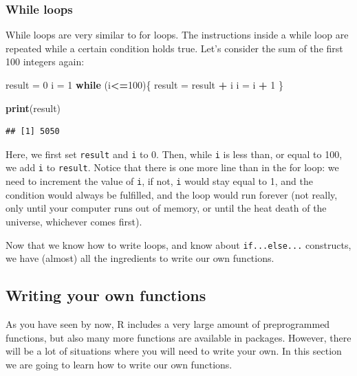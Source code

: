 \documentclass[]{gitbook}
\newenvironment{Shaded}{\begin{snugshade}}{\end{snugshade}}
\newcommand{\ControlFlowTok}[1]{\textcolor[rgb]{0.13,0.29,0.53}{\textbf{#1}}}
\newcommand{\DecValTok}[1]{\textcolor[rgb]{0.00,0.00,0.81}{#1}}
\newcommand{\KeywordTok}[1]{\textcolor[rgb]{0.13,0.29,0.53}{\textbf{#1}}}
\newcommand{\NormalTok}[1]{#1}
\newcommand{\OperatorTok}[1]{\textcolor[rgb]{0.81,0.36,0.00}{\textbf{#1}}}
\newcommand{\StringTok}[1]{\textcolor[rgb]{0.31,0.60,0.02}{#1}}
\begin{document}
\hypertarget{while-loops}{%
\subsubsection{While loops}\label{while-loops}}

While loops are very similar to for loops. The instructions inside a while loop are repeated while a
certain condition holds true. Let's consider the sum of the first 100 integers again:

\begin{Shaded}
\begin{Highlighting}[]
\NormalTok{result =}\StringTok{ }\DecValTok{0}
\NormalTok{i =}\StringTok{ }\DecValTok{1}
\ControlFlowTok{while}\NormalTok{ (i}\OperatorTok{<=}\DecValTok{100}\NormalTok{)\{}
\NormalTok{  result =}\StringTok{ }\NormalTok{result }\OperatorTok{+}\StringTok{ }\NormalTok{i}
\NormalTok{  i =}\StringTok{ }\NormalTok{i }\OperatorTok{+}\StringTok{ }\DecValTok{1}
\NormalTok{\}}

\KeywordTok{print}\NormalTok{(result)}
\end{Highlighting}
\end{Shaded}

\begin{verbatim}
## [1] 5050
\end{verbatim}

Here, we first set \texttt{result} and \texttt{i} to 0. Then, while \texttt{i} is less than, or equal to 100, we add \texttt{i}
to \texttt{result}. Notice that there is one more line than in the for loop: we need to increment the value
of \texttt{i}, if not, \texttt{i} would stay equal to 1, and the condition would always be fulfilled, and
the loop would run forever (not really, only until your computer runs out of memory, or until the
heat death of the universe, whichever comes first).

Now that we know how to write loops, and know about \texttt{if...else...} constructs, we have (almost) all
the ingredients to write our own functions.

\hypertarget{writing-your-own-functions}{%
\subsection{Writing your own functions}\label{writing-your-own-functions}}

As you have seen by now, R includes a very large amount of preprogrammed functions, but also many
more functions are available in packages. However, there will be a lot of situations where you will
need to write your own. In this section we are going to learn how to write our own functions.
\end{document}
